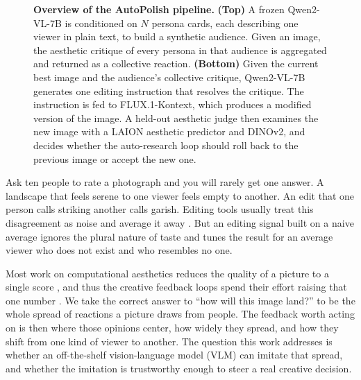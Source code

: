 \documentclass[10pt,twocolumn,letterpaper]{article}
\begin{document}
\begin{figure}[t]
{%
  }
  \caption{\textbf{Overview of the AutoPolish pipeline.} \textbf{(Top)} A frozen Qwen2-VL-7B is conditioned on $N$ persona cards, each describing one viewer in plain text, to build a synthetic audience. Given an image, the aesthetic critique of every persona in that audience is aggregated and returned as a collective reaction. \textbf{(Bottom)} Given the current best image and the audience's collective critique, Qwen2-VL-7B generates one editing instruction that resolves the critique. The instruction is fed to FLUX.1-Kontext, which produces a modified version of the image. A held-out aesthetic judge then examines the new image with a LAION aesthetic predictor and DINOv2, and decides whether the auto-research loop should roll back to the previous image or accept the new one.}
  \label{fig:overview}
\end{figure}


Ask ten people to rate a photograph and you will rarely get one answer. A landscape that feels serene to one viewer feels empty to another. An edit that one person calls striking another calls garish. Editing tools usually treat this disagreement as noise and average it away \citep{murray2012ava, schuhmann2022, xu2023imagereward, kirstain2023pickapic}. But an editing signal built on a naive average ignores the plural nature of taste \citep{uma2021, plank2022} and tunes the result for an average viewer who does not exist and who resembles no one.

Most work on computational aesthetics reduces the quality of a picture to a single score \citep{murray2012ava, ke2023vila, wu2024qalign}, and thus the creative feedback loops spend their effort raising that one number \citep{black2024ddpo, wallace2024dpo}. We take the correct answer to ``how will this image land?'' to be the whole spread of reactions a picture draws from people. The feedback worth acting on is then where those opinions center, how widely they spread, and how they shift from one kind of viewer to another. The question this work addresses is whether an off-the-shelf vision-language model (VLM) can imitate that spread, and whether the imitation is trustworthy enough to steer a real creative decision.
\end{document}
